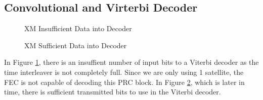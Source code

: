 \documentclass[conference,onecolumn]{IEEEtran}
\begin{document}



\subsection{Convolutional and Virterbi Decoder}

\begin{figure}[H]
	\centerline{}
	\caption{XM Insufficient Data into Decoder}
	\label{fig::Viterbi_1}
\end{figure}
\begin{figure}[H]
	\centerline{}
	\caption{XM Sufficient Data into Decoder}
	\label{fig::Viterbi_2}
\end{figure}

In Figure \ref{fig::Viterbi_1}, there is an insuffient number of input bits to a Viterbi decoder as the time interleaver is not completely full.  Since we are only using 1 satellite, the FEC is not capable of decoding this PRC block.  In Figure \ref{fig::Viterbi_2}, which is later in time, there is sufficient transmitted bits to use in the Viterbi decoder.\\
\end{document}
